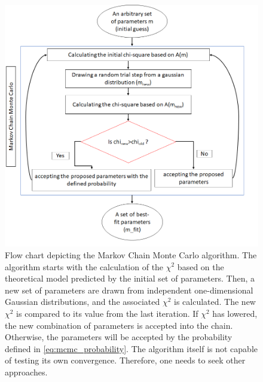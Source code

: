 \documentclass[12pt, TexShade, letterpaper]{report}
\begin{document}
\begin{figure}[h!]
\centering
\includegraphics[scale =0.9]{MCMC_flow.png}
\caption[Flow chart of MCMC]{Flow chart depicting the Markov Chain Monte Carlo algorithm. The algorithm starts with the calculation of the $\chi^2$ based on the theoretical model predicted by the initial set of parameters. Then, a new set of parameters are drawn from independent one-dimensional Gaussian distributions, and the associated $\chi^2$ is calculated. The new $\chi^2$ is compared to its value from the last iteration. If $\chi^2$ has lowered, the new combination of parameters is accepted into the chain. Otherwise, the parameters will be accepted by the probability defined in \ref{eq:mcmc_probability}. The algorithm itself is not capable of testing its own convergence. Therefore, one needs to seek other approaches.}
\label{fig:MCMC_flow}
\end{figure}
\end{document}
